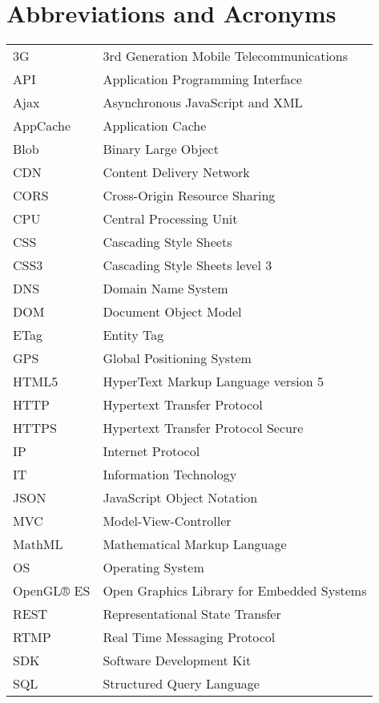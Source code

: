 \chapter*{Abbreviations and Acronyms}

\noindent
\begin{longtable}{@{}p{}p{}@{}}

3G & 3rd Generation Mobile Telecommunications\\
API & Application Programming Interface\\
Ajax & Asynchronous JavaScript and XML\\
AppCache & Application Cache\\
Blob & Binary Large Object\\
CDN & Content Delivery Network\\
CORS & Cross-Origin Resource Sharing\\
CPU & Central Processing Unit\\
CSS & Cascading Style Sheets\\
CSS3 & Cascading Style Sheets level 3\\
DNS & Domain Name System\\
DOM & Document Object Model\\
ETag & Entity Tag\\
GPS & Global Positioning System\\
HTML5 & HyperText Markup Language version 5\\
HTTP & Hypertext Transfer Protocol\\
HTTPS & Hypertext Transfer Protocol Secure\\
IP & Internet Protocol\\
IT & Information Technology\\
JSON & JavaScript Object Notation\\
MVC & Model-View-Controller\\
MathML & Mathematical Markup Language\\
OS & Operating System\\
OpenGL® ES & Open Graphics Library for Embedded Systems\\
REST & Representational State Transfer\\
RTMP & Real Time Messaging Protocol\\
SDK & Software Development Kit\\
SQL & Structured Query Language\\

\end{longtable}

